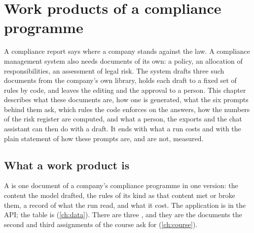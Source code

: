 \chapter{Work products of a compliance programme}\label{ch:programme}

A compliance report says where a company stands against the law. A compliance management system
also needs documents of its own: a policy, an allocation of responsibilities, an assessment of
legal risk. The system drafts three such documents from the company's own library, holds each
draft to a fixed set of rules by code, and leaves the editing and the approval to a person.
This chapter describes what these documents are, how one is generated, what the six prompts
behind them ask, which rules the code enforces on the answers, how the numbers of the risk
register are computed, and what a person, the exports and the chat assistant can then do with a
draft. It ends with what a run costs and with the plain statement of how these prompts are, and
are not, measured.


\section{What a work product is}\label{sec:programme:what}

A  is one document of a company's compliance programme in one version: the
content the model drafted, the rules of its kind as that content met or broke them, a record
of what the run read, and what it cost. The application is  in the API; the
table is  (\cref{ch:data}). There are three , and they are the
documents the second and third assignments of the course ask for (\cref{ch:course}).

